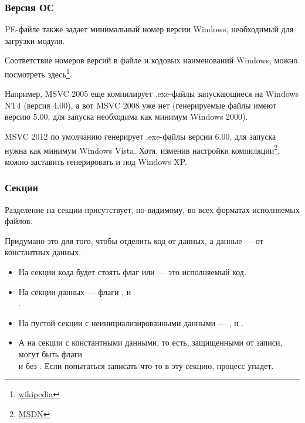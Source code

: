 \subsubsection{Версия ОС}

PE-файле также задает минимальный номер версии Windows, необходимый для загрузки модуля.

Соответствие номеров версий в файле и кодовых наименований Windows, можно посмотреть
здесь\footnote{\href{http://go.yurichev.com/17044}{wikipedia}}.

Например, \ac{MSVC} 2005 еще компилирует .exe-файлы запускающиеся на Windows NT4 (версия 4.00), а вот \ac{MSVC} 2008 уже нет 
(генерируемые файлы имеют версию 5.00, для запуска необходима как минимум Windows 2000).

\ac{MSVC} 2012 по умолчанию генерирует .exe-файлы версии 6.00, для запуска нужна как минимум Windows Vista. 
Хотя, изменив настройки компиляции\footnote{\href{http://go.yurichev.com/17045}{MSDN}},
можно заставить генерировать и под Windows XP.

\subsubsection{Секции}

Разделение на секции присутствует, по-видимому, во всех форматах исполняемых файлов.

Придумано это для того, чтобы отделить код от данных, а данные --- от константных данных.


\begin{itemize}
\item На секции кода будет стоять флаг  или  --- это исполняемый код.

\item На секции данных --- флаги ,  и \\
.

\item На пустой секции с неинициализированными данными --- ,  и .

\item А на секции с константными данными, то есть, защищенными от записи, могут быть флаги \\
 и  без . 
Если попытаться записать что-то в эту секцию, процесс упадет.
\end{itemize}

